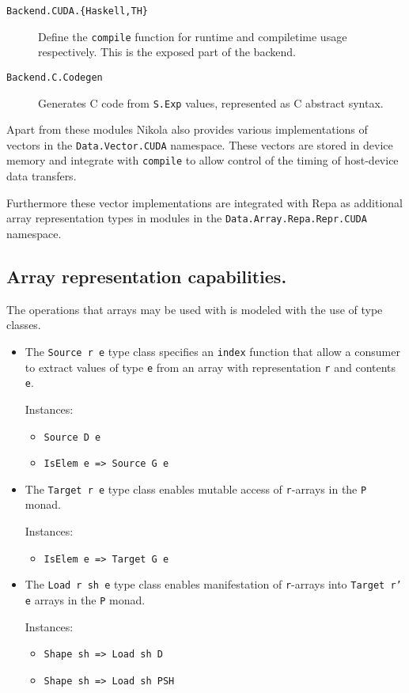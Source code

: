 \begin{description}

  \item[\texttt{Backend.CUDA.\{Haskell,TH\}}]
    Define the \texttt{compile} function for runtime and compiletime usage
    respectively. This is the exposed part of the backend.

  \item[\texttt{Backend.C.Codegen}] Generates C code from
    \texttt{S.Exp} values, represented as C abstract syntax.

\end{description}

Apart from these modules Nikola also provides various implementations of
vectors in the \texttt{Data.Vector.CUDA} namespace. These vectors are
stored in device memory and integrate with \texttt{compile} to allow
control of the timing of host-device data transfers.

Furthermore these vector implementations are integrated with Repa as additional
array representation types in modules in the \texttt{Data.Array.Repa.Repr.CUDA}
namespace.

\subsection{Array representation capabilities.}

The operations that arrays may be used with is modeled with the use of type
classes.

\begin{itemize}

  \item The \texttt{Source r e} type class specifies an \texttt{index}
    function that allow a consumer to extract values of type \texttt{e} from an
    array with representation \texttt{r} and contents \texttt{e}.

    Instances:
    \begin{itemize}
      \item \texttt{Source D e}
      \item \texttt{IsElem e => Source G e}
    \end{itemize}

  \item The \texttt{Target r e} type class enables mutable access of
    \texttt{r}-arrays in the \texttt{P} monad.

    Instances:
    \begin{itemize}
      \item \texttt{IsElem e => Target G e}
    \end{itemize}

  \item The \texttt{Load r sh e} type class enables manifestation of
    \texttt{r}-arrays into \texttt{Target r' e} arrays in the \texttt{P} monad.

    Instances:
    \begin{itemize}
      \item \texttt{Shape sh => Load sh D}
      \item \texttt{Shape sh => Load sh PSH}
    \end{itemize}
\end{itemize}

